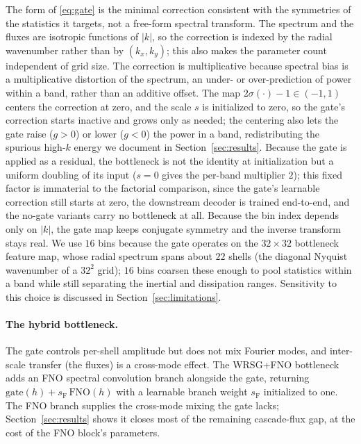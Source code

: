 \documentclass[10pt]{article} %
\begin{document}
The form of \eqref{eq:gate} is the minimal correction consistent with the symmetries of the statistics it targets, not a free-form spectral transform. The spectrum and the fluxes are isotropic functions of $|k|$, so the correction is indexed by the radial wavenumber rather than by $(k_x, k_y)$; this also makes the parameter count independent of grid size. The correction is multiplicative because spectral bias is a multiplicative distortion of the spectrum, an under- or over-prediction of power within a band, rather than an additive offset. The map $2\sigma(\cdot)-1 \in (-1,1)$ centers the correction at zero, and the scale $s$ is initialized to zero, so the gate's correction starts inactive and grows only as needed; the centering also lets the gate raise ($g>0$) or lower ($g<0$) the power in a band, redistributing the spurious high-$k$ energy we document in Section~\ref{sec:results}. Because the gate is applied as a residual, the bottleneck is not the identity at initialization but a uniform doubling of its input ($s=0$ gives the per-band multiplier $2$); this fixed factor is immaterial to the factorial comparison, since the gate's learnable correction still starts at zero, the downstream decoder is trained end-to-end, and the no-gate variants carry no bottleneck at all. Because the bin index depends only on $|k|$, the gate map keeps conjugate symmetry and the inverse transform stays real. We use $16$ bins because the gate operates on the $32 \times 32$ bottleneck feature map, whose radial spectrum spans about $22$ shells (the diagonal Nyquist wavenumber of a $32^2$ grid); $16$ bins coarsen these enough to pool statistics within a band while still separating the inertial and dissipation ranges. Sensitivity to this choice is discussed in Section~\ref{sec:limitations}.

\paragraph{The hybrid bottleneck.} The gate controls per-shell amplitude but does not mix Fourier modes, and inter-scale transfer (the fluxes) is a cross-mode effect. The WRSG+FNO bottleneck adds an FNO spectral convolution branch alongside the gate, returning $\text{gate}(h) + s_{\text{F}}\,\text{FNO}(h)$ with a learnable branch weight $s_{\text{F}}$ initialized to one. The FNO branch supplies the cross-mode mixing the gate lacks; Section~\ref{sec:results} shows it closes most of the remaining cascade-flux gap, at the cost of the FNO block's parameters.
\end{document}
